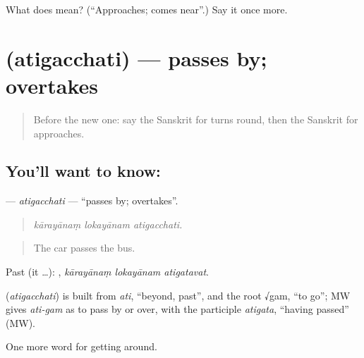 \begin{tcolorbox}[breakable,colback=teal!4,colframe=teal!35!black,title={Before you move on}]
What does  mean? (\textquotedblleft{}Approaches; comes near\textquotedblright{}.) Say it once more.
\end{tcolorbox}
\section[\texorpdfstring{\sk{अतिगच्छति} (atigacchati)}{अतिगच्छति (atigacchati)}]{ (atigacchati) — passes by; overtakes}

\label{lesson:SA-C412-atigacchati}



\begin{quote}
Before the new one: say the Sanskrit for turns round, then the Sanskrit for approaches.
\end{quote}

\subsection*{You'll want to know: }
\textbf{} — \emph{atigacchati} — \textquotedblleft{}passes by; overtakes\textquotedblright{}.

\begin{quote}
  
\end{quote}

\begin{quote}
\emph{kārayānaṃ lokayānam atigacchati.}
\end{quote}

\begin{quote}
The car passes the bus.
\end{quote}

Past (it …):   , \emph{kārayānaṃ lokayānam atigatavat}.

\begin{cousinweb}
\textbf{} (\emph{atigacchati}) is built from \emph{ati}, \textquotedblleft{}beyond, past\textquotedblright{}, and the root √gam, \textquotedblleft{}to go\textquotedblright{}; MW gives \emph{ati-gam} as to pass by or over, with the participle \emph{atigata}, \textquotedblleft{}having passed\textquotedblright{} (MW).
\end{cousinweb}

\begin{grammarlens}[title={What you've built}]
One more word for getting around.
\end{grammarlens}

